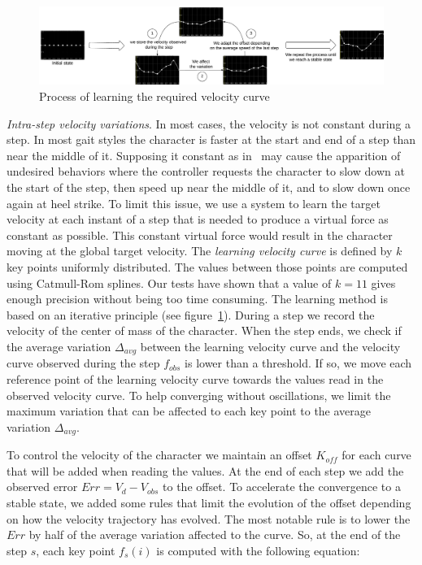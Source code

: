\documentclass[runningheads,a4paper,10pt]{llncs}
\begin{document}
\begin{figure}[t]
\centering
\includegraphics[scale=0.3]{images/speed_curve_learner.pdf}
\caption{Process of learning the required velocity curve}
\label{fig:speed_curve_learner}
\end{figure}

\textit{Intra-step velocity variations}. In most cases, the velocity is not constant during a step. In most gait styles the character is faster at the start and end of a step than near the middle of it. Supposing it constant as in~\citep{coros2010generalized} may cause the apparition of undesired behaviors where the controller requests the character to slow down at the start of the step, then speed up near the middle of it, and to slow down once again at heel strike. To limit this issue, we use a system to learn the target velocity at each instant of a step that is needed to produce a virtual force as constant as possible. This constant virtual force would result in the character moving at the global target velocity. The \textit{learning velocity curve} is defined by $k$ key points uniformly distributed. The values between those points are computed using Catmull-Rom splines. Our tests have shown that a value of $k=11$ gives enough precision without being too time consuming.
The learning method is based on an iterative principle (see figure~\ref{fig:speed_curve_learner}). During a step we record the velocity of the center of mass of the character. When the step ends, we check if the average variation $\Delta_{avg}$ between the learning velocity curve and the velocity curve observed during the step $f_{obs}$ is lower than a threshold. If so, we move each reference point of the learning velocity curve towards the values read in the observed velocity curve. To help converging without oscillations, we limit the maximum variation that can be affected to each key point to the average variation $\Delta_{avg}$. 

To control the velocity of the character we maintain an offset $K_{off}$ for each curve that will be added when reading the values. At the end of each step we add the observed error $Err = V_d - V_{obs}$ to the offset. To accelerate the convergence to a stable state, we added some rules that limit the evolution of the offset depending on how the velocity trajectory has evolved. The most notable rule is to lower the $Err$ by half of the average variation affected to the curve. So, at the end of the step $s$, each key point $f_s(i)$ is computed with the following equation:
\end{document}
